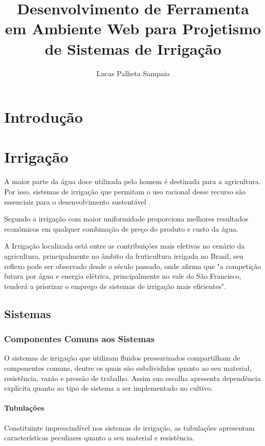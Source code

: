 \documentclass[12pt,a4paper]{book}
\author{Lucas Palheta Sampaio}
\title{Desenvolvimento de Ferramenta em Ambiente Web para Projetismo de Sistemas de Irrigação}
\begin{document}
\maketitle 
\tableofcontents

\chapter{Introdução}



\chapter{Irrigação}

A maior parte da água doce utilizada pelo homem é destinada para a agricultura. Por isso, sistemas de irrigação que permitam o uso racional desse recurso são essenciais para o desenvolvimento sustentável \cite{catalogotigre}.

	Segundo \cite{paz2002otimizaccao} a irrigação com maior uniformidade proporciona melhores resultados econômicos em qualquer combinação de preço do produto e custo da água.

A Irrigação localizada está entre as contribuições mais efetivas no cenário da agricultura, principalmente no âmbito da fruticultura irrigada no Brasil, seu reflexo pode ser observado desde o século passado, onde \cite{nascimento1999caracterizaccao} afirma que "a competição futura por água e energia elétrica, principalmente no vale do São Francisco, tenderá a priorizar o
emprego de sistemas de irrigação mais eficientes".



\section{Sistemas}
\subsection{Componentes Comuns aos Sistemas}
O sistemas de irrigação que utilizam fluidos pressurizados compartilham de componentes comuns, dentre os quais são subdivididos quanto ao seu material, resistência, vazão e pressão de trabalho. Assim sua escolha apresenta dependência explicita quanto ao tipo de sistema a ser implementado no cultivo.



\subsubsection{Tubulações}
Constituinte imprescindível nos sistemas de irrigação, as tubulações apresentam características peculiares quanto a seu material e resistência.
\end{document}
